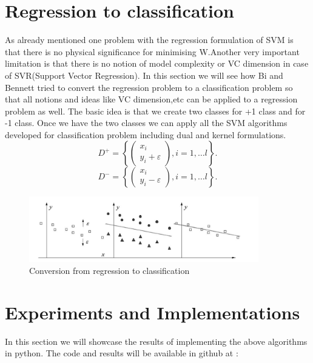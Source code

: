 \documentclass[../main.tex]{subfiles}
\begin{document}
\section{Regression to classification}
As already mentioned one problem with the regression formulation of SVM is that there is no physical significance for minimising W.Another very important limitation is that there is no notion of model complexity or VC dimension in case of SVR(Support Vector Regression). In this section we will see how Bi and Bennett tried to convert the regression problem to a classification problem so that all notions and ideas like VC dimension,etc can be applied to a regression problem as well.
\newline
The basic idea is that we create two classes for +1 class and for -1 class. Once we have the two classes we can apply all the SVM algorithms developed for classification problem including dual and kernel formulations.
$$D^{+}=\left\{\left(\begin{array}{l}
x_{i} \\
y_{i}+\varepsilon
\end{array}\right), i=1, \ldots l\right\} .$$
$$D^{-}=\left\{\left(\begin{array}{l}
x_{i} \\
y_{i}-\varepsilon
\end{array}\right), i=1, \ldots l\right\} .$$
    \begin{figure}[htp]
    \centering
    \includegraphics[width=10cm]{H5.png}
    \caption{Conversion from regression to classification}
    \label{Conversion from regression to classification}
    \end{figure}
\section{Experiments and Implementations}
In this section we will showcase the results of implementing the above algorithms in python. The code and results will be available in github at :
\end{document}
